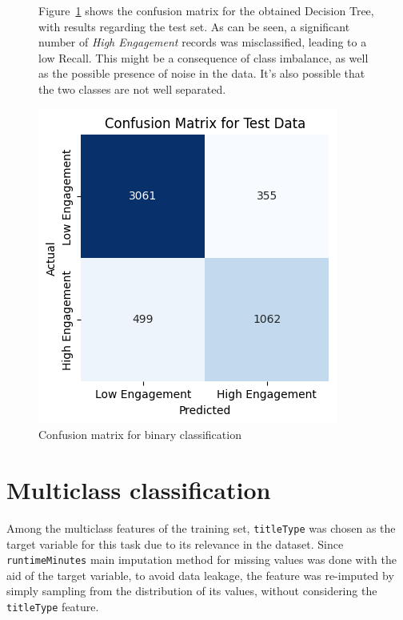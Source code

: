 \begin{figure}[h]
    \begin{minipage}{0.58\textwidth}
        Figure~\ref{fig:conf_matr_binary_dt} shows the confusion matrix for the obtained
        Decision Tree, with results regarding the test set.
        As can be seen, a significant number of \textit{High Engagement} records was misclassified,
        leading to a low Recall.
        This might be a consequence of class imbalance, as well as the possible presence
        of noise in the data. It's also possible that the two classes are not well separated.
    \end{minipage}
    \hfill
    \begin{minipage}{0.38\textwidth}
        \includegraphics[width=\linewidth]{plots/binary_dt_confusion_matrix.png}
        \captionsetup{justification=centering, width=0.9\linewidth}
        \caption{Confusion matrix for binary classification}
        \label{fig:conf_matr_binary_dt}
    \end{minipage}
\end{figure}


\section{Multiclass classification}\label{sec:multiclass_classification}
Among the multiclass features of the training set, \texttt{titleType}
was chosen as the target variable for this task due to its relevance in the dataset.
Since \texttt{runtimeMinutes} main imputation method for missing values was done
with the aid of the target variable, to avoid data leakage, the feature was re-imputed
by simply sampling from the distribution of its values, without considering the \texttt{titleType}
feature.\\

